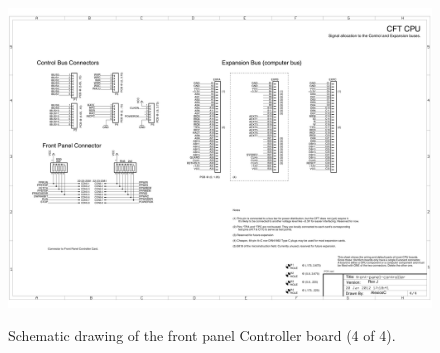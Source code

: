 \documentclass[11pt,a4paper,twocolumns]{article}
\begin{document}
\begin{figure}
\centering
\includegraphics[width=0.95\textheight,angle=90]{figs/front-panel-controller-4.jpg}\\
\caption{\label{fig-schematic-front-panel-controller-4}Schematic drawing of the front panel Controller board (4 of 4).}
\end{figure}

\clearpage
\end{document}
